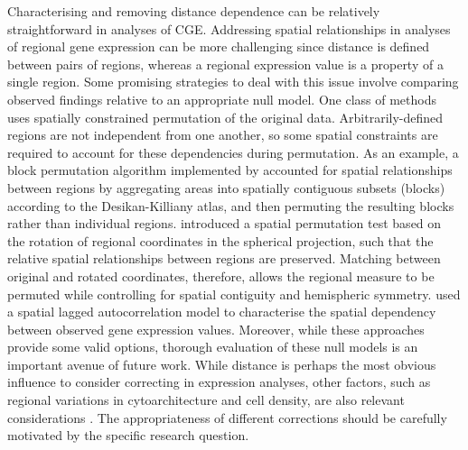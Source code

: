Characterising and removing distance dependence can be relatively straightforward in analyses of CGE. Addressing spatial relationships in analyses of regional gene expression can be more challenging since distance is defined between pairs of regions, whereas a regional expression value is a property of a single region. Some promising strategies to deal with this issue involve comparing observed findings relative to an appropriate null model. One class of methods uses spatially constrained permutation of the original data. Arbitrarily-defined regions are not independent from one another, so some spatial constraints are required to account for these dependencies during permutation. As an example, a block permutation algorithm implemented by \citet{Vertes2016b} accounted for spatial relationships between regions by aggregating areas into spatially contiguous subsets (blocks) according to the Desikan-Killiany atlas, and then permuting the resulting blocks rather than individual regions. \mbox{\citet{Vasa2018}} introduced a spatial permutation test based on the rotation of regional coordinates in the spherical projection, such that the relative spatial relationships between regions are preserved. Matching between original and rotated coordinates, therefore, allows the regional measure to be permuted while controlling for spatial contiguity and hemispheric symmetry. \citet{Burt2018} used a spatial lagged autocorrelation model to characterise the spatial dependency between observed gene expression values. Moreover, while these approaches provide some valid options, thorough evaluation of these null models is an important avenue of future work. While distance is perhaps the most obvious influence to consider correcting in expression analyses, other factors, such as regional variations in cytoarchitecture and cell density, are also relevant considerations \citep{Barbas2015,Burt2018}. The appropriateness of different corrections should be carefully motivated by the specific research question.

